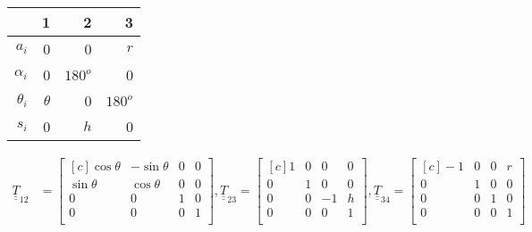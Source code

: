 \documentclass[onecolumn,10pt]{jhwhw}
\def\du#1{\underline{\underline{#1}}}
\begin{document}
\begin{center}
\begin{tabular}{r|rrr}
& 1 & 2 & 3 \\
\midrule
$a_i$ &      0 & 0 & $r$ \\
$\alpha_i$ & 0 & $180^o$ & 0 \\    
$\theta_i$ & $\theta$ & 0 & $180^o$ \\ 
$s_i$ &      0 & $h$ & 0 \\
\end{tabular}
\end{center}

\begin{align*}
\du{T}_{12} &=
\begin{bmatrix*}[c]
\cos \theta & - \sin \theta & 0 & 0 \\
\sin \theta &   \cos \theta & 0 & 0 \\
0 & 0 & 1 & 0\\
0 & 0 & 0 & 1\\
\end{bmatrix*},
\du{T}_{23} =
\begin{bmatrix*}[c]
1 & 0 & 0 & 0\\
0 & 1 & 0 & 0\\
0 & 0 & -1 & h\\
0 & 0 & 0 & 1\\
\end{bmatrix*},
\du{T}_{34} =
\begin{bmatrix*}[c]
-1 & 0 & 0 & r\\
0 & 1 & 0 & 0\\
0 & 0 & 1 & 0\\
0 & 0 & 0 & 1\\
\end{bmatrix*}
\end{align*}
\end{document}
